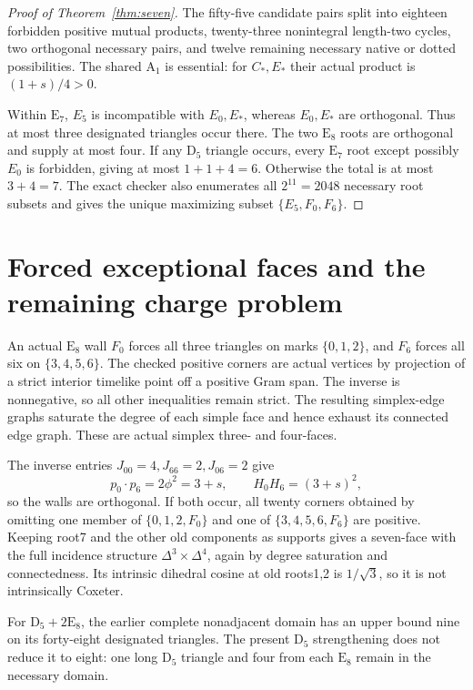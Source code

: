 \documentclass[11pt]{article}
\newcommand{\E}{\mathrm E}
\newcommand{\D}{\mathrm D}
\newcommand{\A}{\mathrm A}
\begin{document}
\begin{proof}[Proof of Theorem~\ref{thm:seven}]
The fifty-five candidate pairs split into eighteen forbidden positive
mutual products, twenty-three nonintegral length-two cycles, two
orthogonal necessary pairs, and twelve remaining necessary native or
dotted possibilities. The shared $\A_1$ is essential: for $C_*,E_*$
their actual product is $(1+s)/4>0$.

Within $\E_7$, $E_5$ is incompatible with $E_0,E_*$, whereas $E_0,E_*$
are orthogonal. Thus at most three designated triangles occur there.
The two $\E_8$ roots are orthogonal and supply at most four. If any
$\D_5$ triangle occurs, every $\E_7$ root except possibly $E_0$ is
forbidden, giving at most $1+1+4=6$. Otherwise the total is at most
$3+4=7$. The exact checker also enumerates all $2^{11}=2048$ necessary
root subsets and gives the unique maximizing subset
$\{E_5,F_0,F_6\}$.
\end{proof}

\section{Forced exceptional faces and the remaining charge problem}
An actual $\E_8$ wall $F_0$ forces all three triangles on marks
$\{0,1,2\}$, and $F_6$ forces all six on $\{3,4,5,6\}$. The checked
positive corners are actual vertices by projection of a strict interior
timelike point off a positive Gram span. The inverse is nonnegative,
so all other inequalities remain strict. The resulting simplex-edge
graphs saturate the degree of each simple face and hence exhaust its
connected edge graph. These are actual simplex three- and four-faces.

The inverse entries $J_{00}=4,J_{66}=2,J_{06}=2$ give
\[
 p_0\cdot p_6=2\phi^2=3+s,
 \qquad H_0H_6=(3+s)^2,
\]
so the walls are orthogonal. If both occur, all twenty corners obtained
by omitting one member of $\{0,1,2,F_0\}$ and one of
$\{3,4,5,6,F_6\}$ are positive. Keeping root7 and the other old
components as supports gives a seven-face with the full incidence
structure $\Delta^3\times\Delta^4$, again by degree saturation and
connectedness. Its intrinsic dihedral cosine at old roots1,2 is
$1/\sqrt3$, so it is not intrinsically Coxeter.

For $\D_5+2\E_8$, the earlier complete nonadjacent domain has an upper
bound nine on its forty-eight designated triangles. The present
$\D_5$ strengthening does not reduce it to eight: one long $\D_5$
triangle and four from each $\E_8$ remain in the necessary domain.
\end{document}

